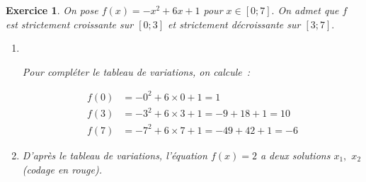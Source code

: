 \documentclass[10pt]{article}
\newtheorem{exo}{Exercice}
\begin{document}
\newpage

\begin{exo}


On pose $f(x)=-x^2+6x+1$ pour $x\in\left[0;7\right].$ On admet que $f$ est strictement croissante sur $\left[0;3\right]$ et strictement décroissante sur $\left[3;7\right].$ 

\medskip

\setlength{\columnseprule}{1pt}

\begin{multicols}{2}


\begin{enumerate}
\item ~{}

\begin{center}
\end{center}

Pour compléter le tableau de variations, on calcule~:

\begin{align*}
f(0)&=-0^2+6\times 0+1=1\\
f(3)&=-3^2+6\times 3+1=-9+18+1=10\\
f(7)&=-7^2+6\times 7+1=-49+42+1=-6
\end{align*}

\item D'après le tableau de variations, l'équation $f(x)=2$ a deux solutions $x_1,$ $x_2$ (codage en rouge).

\end{enumerate}
\end{multicols}

\end{exo}
\end{document}
